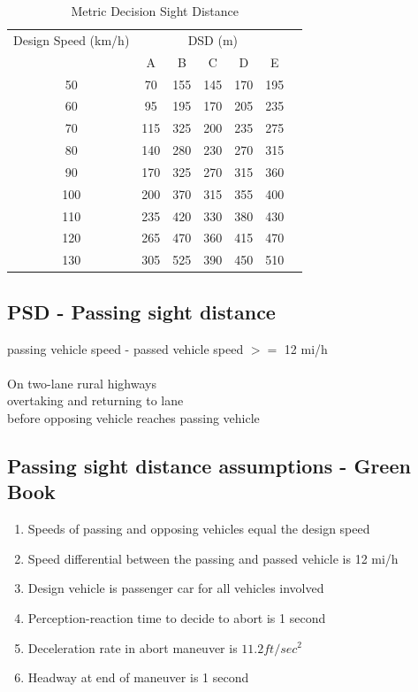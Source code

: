 \documentclass{article}
\begin{document}
  \begin{table}[h!]
  \centering
  \caption{Metric Decision Sight Distance}
  \label{tab:metric_decision_sight_distance}
  \begin{tabular}{ccccccc}
  \toprule
  Design Speed (km/h) & \multicolumn{5}{c}{DSD (m)} \\
  \cmidrule(lr){2-6}
  & A & B & C & D & E \\
  \midrule
  50 & 70 & 155 & 145 & 170 & 195 \\
  60 & 95 & 195 & 170 & 205 & 235 \\
  70 & 115 & 325 & 200 & 235 & 275 \\
  80 & 140 & 280 & 230 & 270 & 315 \\
  90 & 170 & 325 & 270 & 315 & 360 \\
  100 & 200 & 370 & 315 & 355 & 400 \\
  110 & 235 & 420 & 330 & 380 & 430 \\
  120 & 265 & 470 & 360 & 415 & 470 \\
  130 & 305 & 525 & 390 & 450 & 510 \\
  \bottomrule
  \end{tabular}
  \end{table}

  \newpage

  \subsection{PSD - Passing sight distance}
  passing vehicle speed - passed vehicle speed $>=$ 12 mi/h\\
  \\
  On two-lane rural highways\\
  overtaking and returning to lane\\
  before opposing vehicle reaches passing vehicle\\


  \subsection{Passing sight distance assumptions - Green Book}
  \begin{enumerate}
    \item Speeds of passing and opposing vehicles equal the design speed
    \item Speed differential between the passing and passed vehicle is 12 mi/h
    \item Design vehicle is passenger car for all vehicles involved
    \item Perception-reaction time to decide to abort is 1 second
    \item Deceleration rate in abort maneuver is $11.2 ft/sec^2$
    \item Headway at end of maneuver is 1 second
  \end{enumerate}
\end{document}

